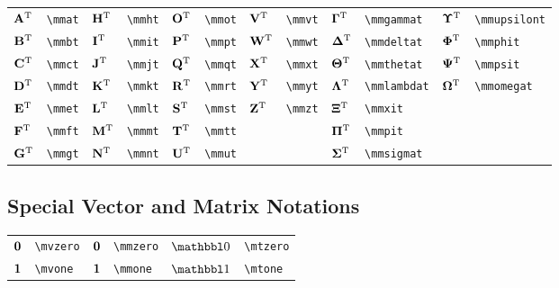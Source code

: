 \documentclass{article}
\begin{document}
\begin{tabular}{*{12}{l}}
    ${{\mathbf A}^{\mathrm T}}$ & \lstinline`\mmat` & ${{\mathbf H}^{\mathrm T}}$ & \lstinline`\mmht` & ${{\mathbf O}^{\mathrm T}}$ & \lstinline`\mmot` & ${{\mathbf V}^{\mathrm T}}$ & \lstinline`\mmvt` & ${{\bm \Gamma}^{\mathrm T}}$  & \lstinline`\mmgammat` & ${{\bm \Upsilon}^{\mathrm T}}$ & \lstinline`\mmupsilont` \\
    ${{\mathbf B}^{\mathrm T}}$ & \lstinline`\mmbt` & ${{\mathbf I}^{\mathrm T}}$ & \lstinline`\mmit` & ${{\mathbf P}^{\mathrm T}}$ & \lstinline`\mmpt` & ${{\mathbf W}^{\mathrm T}}$ & \lstinline`\mmwt` & ${{\bm \Delta}^{\mathrm T}}$  & \lstinline`\mmdeltat` & ${{\bm \Phi}^{\mathrm T}}$     & \lstinline`\mmphit` \\
    ${{\mathbf C}^{\mathrm T}}$ & \lstinline`\mmct` & ${{\mathbf J}^{\mathrm T}}$ & \lstinline`\mmjt` & ${{\mathbf Q}^{\mathrm T}}$ & \lstinline`\mmqt` & ${{\mathbf X}^{\mathrm T}}$ & \lstinline`\mmxt` & ${{\bm \Theta}^{\mathrm T}}$  & \lstinline`\mmthetat` & ${{\bm \Psi}^{\mathrm T}}$     & \lstinline`\mmpsit` \\
    ${{\mathbf D}^{\mathrm T}}$ & \lstinline`\mmdt` & ${{\mathbf K}^{\mathrm T}}$ & \lstinline`\mmkt` & ${{\mathbf R}^{\mathrm T}}$ & \lstinline`\mmrt` & ${{\mathbf Y}^{\mathrm T}}$ & \lstinline`\mmyt` & ${{\bm \Lambda}^{\mathrm T}}$ & \lstinline`\mmlambdat` & ${{\bm \Omega}^{\mathrm T}}$   & \lstinline`\mmomegat` \\
    ${{\mathbf E}^{\mathrm T}}$ & \lstinline`\mmet` & ${{\mathbf L}^{\mathrm T}}$ & \lstinline`\mmlt` & ${{\mathbf S}^{\mathrm T}}$ & \lstinline`\mmst` & ${{\mathbf Z}^{\mathrm T}}$ & \lstinline`\mmzt` & ${{\bm \Xi}^{\mathrm T}}$     & \lstinline`\mmxit` &                                          \\
    ${{\mathbf F}^{\mathrm T}}$ & \lstinline`\mmft` & ${{\mathbf M}^{\mathrm T}}$ & \lstinline`\mmmt` & ${{\mathbf T}^{\mathrm T}}$ & \lstinline`\mmtt` &         &                          & ${{\bm \Pi}^{\mathrm T}}$     & \lstinline`\mmpit` &                                          \\
    ${{\mathbf G}^{\mathrm T}}$ & \lstinline`\mmgt` & ${{\mathbf N}^{\mathrm T}}$ & \lstinline`\mmnt` & ${{\mathbf U}^{\mathrm T}}$ & \lstinline`\mmut` &         &                          & ${{\bm \Sigma}^{\mathrm T}}$  & \lstinline`\mmsigmat` &                                          \\
\end{tabular}


\subsection{Special Vector and Matrix Notations}
\begin{tabular}{*{6}{l}}
    ${\mathbf 0}$ & \lstinline`\mvzero` & ${\mathbf 0}$ & \lstinline`\mmzero` & $\mtzero$ & \lstinline`\mtzero` \\
    ${\mathbf 1}$  & \lstinline`\mvone` & ${\mathbf 1}$  & \lstinline`\mmone` & $\mtone$  & \lstinline`\mtone` \\
\end{tabular}
\end{document}
